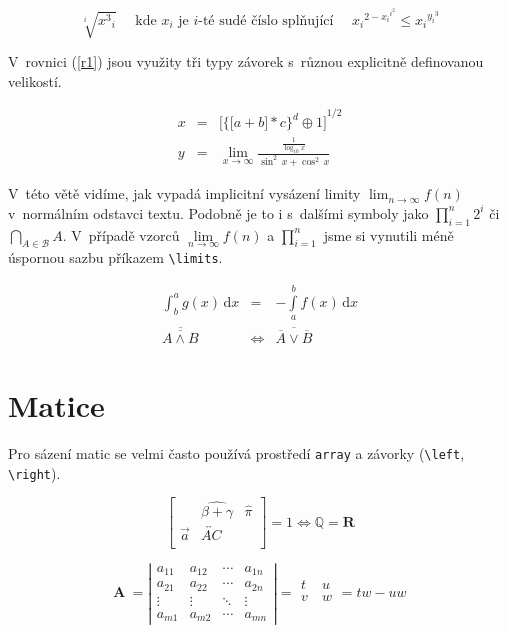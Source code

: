 \documentclass[11pt, a4paper, twocolumn]{article}
\theoremstyle{definition}
\theoremstyle{remark}
\theoremstyle{plain}
\begin{document}
$$\sqrt[i]{{x^3}_i} \quad \text{ kde } x_i \text{ je } i \text{-té sudé číslo splňující } \quad {x_i}^{2-{x_i}^{i^2}} \leq {x_i}^{{y_i}^3}$$

V~rovnici (\ref{r1}) jsou využity tři typy závorek s~různou explicitně definovanou velikostí.

\begin{eqnarray}
x & =  & { \bigg[ \Big\{ \big[ a+b \big] *c\Big\}^d \oplus 1 \bigg] }^{1/2} \label{r1}\\ 
y & = & \lim \limits_{x \to \infty} \frac{ \frac{1}{\log_{10} x} }{\sin^2\,{x} + \cos^2\,{x}}\nonumber
\end{eqnarray}

V~této větě vidíme, jak vypadá implicitní vysázení li\-mity $\lim_{n \to \infty}{f(n)}$ v~normálním odstavci textu. Podobně je to i s~dalšími symboly jako $\prod_{i=1}^{n} 2^i$ či $\bigcap_{A \in \mathcal{B}}A$. V~pří\-padě vzorců $\lim\limits_{n \to \infty} f(n)$ a $\prod\limits^n_{i=1}$ jsme si vynutili méně úspornou sazbu příkazem \verb|\limits|.

\begin{eqnarray}
\int_b^a g(x)\,\mathrm{d}x & = & -\int\limits_a^b f(x)\, \mathrm{d}x\\
\overline{\overline{A \land B}} & \Leftrightarrow & \overline{\overline{A} \vee \overline{B}}
\end{eqnarray}

\section{Matice}
Pro sázení matic se velmi často používá prostředí \verb|array| a závorky (\verb|\left|, \verb|\right|).

$$
\left[
	\begin{array}{ccc}
	 	&  \widehat{\beta + \gamma} & \hat{\pi} \\
		\vec a & \overleftrightarrow{AC}\\
	\end{array}
\right]
 = 1 \Leftrightarrow \mathbb{Q} = \pmb R
$$

$$
\pmb A~= 
\left|
	\begin{array}{cccc}
	 	a_{11} & a_{12} & \cdots & a_{1n}\\
	 	a_{21} & a_{22} & \cdots & a_{2n}\\
	 	\vdots & \vdots & \ddots & \vdots\\
	 	a_{m1} & a_{m2} & \cdots & a_{mn}
	\end{array}
\right|
=
\begin{array}{cc}
	t & u\\
	v~& w\\
\end{array}
= tw - uw
$$
\end{document}
